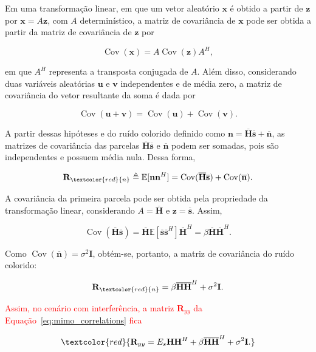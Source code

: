 Em uma transformação linear, em que um vetor aleatório $\mathbf{x}$ é obtido a partir de $\mathbf{z}$ por $\mathbf{x} = A\mathbf{z}$, com $A$ determinístico, a matriz de covariância de $\mathbf{x}$ pode ser obtida a partir da matriz de covariância de $\mathbf{z}$ por 

$$
\operatorname{Cov}(\mathbf{x}) = A\operatorname{Cov}(\mathbf{z})A^H,
$$

em que $A^H$ representa a transposta conjugada de $A$. Além disso, considerando duas variáveis aleatórias $\mathbf{u}$ e $\mathbf{v}$ independentes e de média zero, a matriz de covariância do vetor resultante da soma é dada por

$$
\operatorname{Cov}(\mathbf{u}+\mathbf{v})=\operatorname{Cov}(\mathbf{u})+\operatorname{Cov}(\mathbf{v}).
$$

A partir dessas hipóteses e do ruído colorido definido como $\mathbf{n}=\overline{\mathbf{H}}\overline{\mathbf{s}}+\overline{\mathbf{n}}$, as matrizes de covariância das parcelas $\overline{\mathbf{H}}\overline{\mathbf{s}}$ e $\overline{\mathbf{n}}$ podem ser somadas, pois são independentes e possuem média nula. Dessa forma,

$$
\mathbf{R}_{\textcolor{red}{n}}\triangleq\mathbb{E}[\mathbf{n}\mathbf{n}^H]
=\operatorname{Cov}(\overline{\mathbf{H}}\overline{\mathbf{s}})
+\operatorname{Cov}(\overline{\mathbf{n}}).
$$

A covariância da primeira parcela pode ser obtida pela propriedade da transformação linear, considerando $A=\overline{\mathbf{H}}$ e $\mathbf{z}=\overline{\mathbf{s}}$. Assim,

$$
\operatorname{Cov}(\overline{\mathbf{H}}\overline{\mathbf{s}})
=\overline{\mathbf{H}}\mathbb{E}[\overline{\mathbf{s}}\overline{\mathbf{s}}^H]\overline{\mathbf{H}}^H
=\beta\overline{\mathbf{H}}\overline{\mathbf{H}}^H.
$$

Como $\operatorname{Cov}(\overline{\mathbf{n}})=\sigma^2\mathbf{I}$, obtém-se, portanto, a matriz de covariância do ruído colorido:

$$
\mathbf{R}_{\textcolor{red}{n}}=\beta\overline{\mathbf{H}}\overline{\mathbf{H}}^H+\sigma^2\mathbf{I}.
$$

\textcolor{red}{Assim, no cenário com interferência, a matriz $\mathbf{R}_{yy}$ da Equação~{\hypersetup{linkcolor=red}\eqref{eq:mimo_correlations}} fica}

$$
\textcolor{red}{\mathbf{R}_{yy}=E_s\mathbf{H}\mathbf{H}^H+\beta\overline{\mathbf{H}}\overline{\mathbf{H}}^H+\sigma^2\mathbf{I}.}
$$


